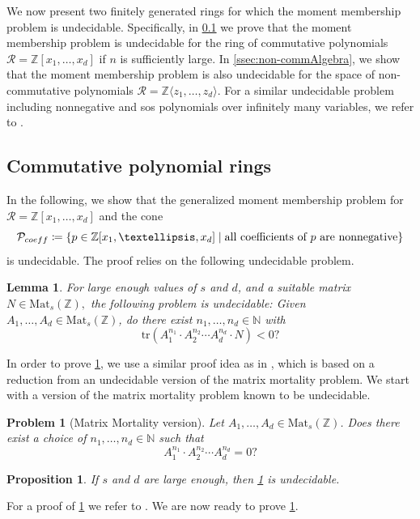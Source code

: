 \documentclass[11pt]{article}
\newtheorem{lemma}[theorem]{Lemma}
\newtheorem{proposition}[theorem]{Proposition}
\newtheorem{problem}[theorem]{Problem}
\theoremstyle{definition}
\newcommand{\tr}{\mathrm{tr}}
\begin{document}
We now present two finitely generated rings for which the moment membership problem is undecidable. Specifically, in \cref{ssec:commAlgebra} we prove that the moment membership problem is undecidable for the ring of commutative polynomials $\mathcal{R} = \mathbb{Z}[x_1, \ldots, x_d]$ if $n$ is sufficiently large. In \cref{ssec:non-commAlgebra}, we show that the moment membership problem is also undecidable for the space of non-commutative polynomials $\mathcal{R} = \mathbb{Z}\langle z_1, \ldots, z_d \rangle$. For a similar undecidable problem including nonnegative and sos polynomials over infinitely many variables, we refer to \cite[Section 6]{De21b}.


\subsection{Commutative polynomial rings}
\label{ssec:commAlgebra}

In the following, we show that the generalized moment membership problem for  $\mathcal R=\mathbb{Z}[x_1, \ldots, x_d]$ and the cone
$$\mathcal{P}_{\rm coeff} \coloneqq \{p \in \mathbb{Z}[x_1, \ldots, x_d]\mid  \text{all coefficients of } p \text{ are nonnegative}\}$$
is undecidable. The proof relies on the following undecidable problem.

\begin{lemma}\label{lem:trace_undec} For large enough values of $s$ and $d$, and a suitable matrix $N \in \mathrm{Mat}_s(\mathbb{Z}),$  the following 
problem is undecidable: Given $A_1, \ldots, A_d \in \mathrm{Mat}_s(\mathbb{Z})$, do there exist  $ n_1, \ldots, n_d \in \mathbb{N}$ with $$\tr(A_1^{n_1} \cdot A_2^{n_2} \cdots A_d^{n_d} \cdot N) < 0?$$
\end{lemma}

In order to prove \cref{lem:trace_undec}, we use a similar proof idea as in \cite{DCCW, Kl22}, which is based on a reduction from an undecidable version of the matrix mortality problem. We start with a version of the matrix mortality problem known to be undecidable.

\begin{problem}[Matrix Mortality version]\label{prob:mortality_version}
Let $A_1, \ldots, A_d \in \mathrm{Mat}_s(\mathbb{Z})$. Does there exist a choice of $n_1, \ldots, n_d \in \mathbb{N}$ such that
$$ A_1^{n_1} \cdot A_2^{n_2} \cdots A_{d}^{n_d} = 0?$$
\end{problem}

\begin{proposition}\label{thm:mortality_version}
If $s$ and $d$ are large enough, then \cref{prob:mortality_version} is undecidable.
\end{proposition}
For a proof of \cref{thm:mortality_version} we refer to \cite{Be08}.
We are now ready to prove \cref{lem:trace_undec}.
\end{document}
